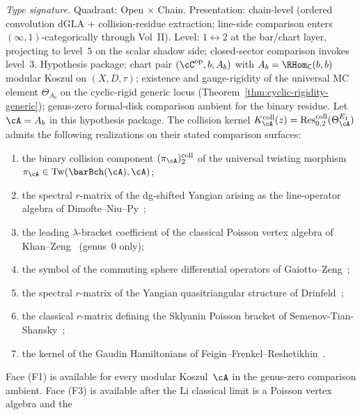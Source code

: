 \begin{theorem}
\label{thm:seven-faces-master}
\emph{Type signature.} Quadrant: Open $\times$ Chain. Presentation:
chain-level (ordered convolution dGLA + collision-residue
extraction; line-side comparison enters $(\infty,1)$-categorically
through Vol~II). Level: $1\leftrightarrow 2$ at the bar/chart layer,
projecting to level~$5$ on the scalar shadow side; closed-sector
comparison invokes level~$3$. Hypothesis package: chart pair
$(\cC^{\mathrm{op}}, b, A_b)$ with
$A_b=\RHom_{\mathsf C}(b,b)$ modular Koszul
on $(X,D,\tau)$; existence and gauge-rigidity of the universal MC
element $\Theta_{A_b}$ on the cyclic-rigid generic locus
\textup{(}Theorem~\textup{\ref{thm:cyclic-rigidity-generic}}\textup{);}
genus-zero formal-disk comparison ambient for the binary residue.
Let $\cA=A_b$ in this hypothesis package. The collision kernel
$K_\cA^{\mathrm{coll}}(z)
=\mathrm{Res}^{\mathrm{coll}}_{0,2}(\Theta_\cA^{E_1})$ admits
the following realizations on their stated comparison surfaces:
\begin{enumerate}[label=\textup{(F\arabic*)}]
\item the binary collision component $(\pi_\cA)_2^{\mathrm{coll}}$
 of the universal twisting morphism
 $\pi_\cA\in\mathrm{Tw}(\barBch(\cA),\cA)$;
\item the spectral $r$-matrix of the dg-shifted Yangian arising as
 the line-operator algebra of Dimofte--Niu--Py~\cite{DNP25};
\item the leading $\lambda$-bracket coefficient of the classical
 Poisson vertex algebra of Khan--Zeng~\cite{KhanZeng25} (genus~$0$ only);
\item the symbol of the commuting sphere differential operators of
 Gaiotto--Zeng~\cite{GZ26};
\item the spectral $r$-matrix of the Yangian quasitriangular
 structure of Drinfeld~\cite{Drinfeld85};
\item the classical $r$-matrix defining the Sklyanin Poisson bracket
 of Semenov-Tian-Shansky~\cite{STS83};
\item the kernel of the Gaudin Hamiltonians of
	 Feigin--Frenkel--Reshetikhin~\cite{FFR94}.
\end{enumerate}
Face \textup{(F1)} is available for every modular Koszul~$\cA$ in
the genus-zero comparison ambient. Face \textup{(F3)} is available
after the Li classical limit is a Poisson vertex algebra and the

\end{theorem}
